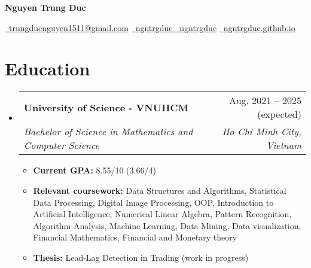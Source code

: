 \documentclass[letterpaper,11pt]{article}
\makeatletter
\newcommand{\heading}[4]{
    \normalsize
    \begin{tabular*}{0.97\textwidth}[t]{l@{\extracolsep{\fill}}r}
      \textbf{#1} & #2 \\[-2pt]
      \textit{\small#3} & \textit{\small #4}
    \end{tabular*}
    \vspace{-2pt}
}
\makeatother
\begin{document}
\begin{center}
    {\Huge \textbf{Nguyen Trung Duc}} \\
    \vspace{0.7em}

    \href{mailto:trungducnguyen1511@gmail.com}{\faEnvelope\ {trungducnguyen1511@gmail.com}} \quad 
    \href{https://www.linkedin.com/in/ngntrgduc/}{\faLinkedin\ {ngntrgduc}
    } \quad
    \href{https://github.com/ngntrgduc}{\faGithub\ {ngntrgduc}} \quad
    \href{https://ngntrgduc.github.io/}{\faHome\ {ngntrgduc.github.io}} 
\end{center}




\section{Education}
\begin{itemize}
    \item \heading{University of Science - VNUHCM}{Aug. 2021 -- 2025 (expected)}
      {Bachelor of Science in Mathematics and Computer Science}{Ho Chi Minh City, Vietnam}
    \begin{itemize}
        \item \textbf{Current GPA:} 8.55/10 (3.66/4)
        \item \textbf{Relevant coursework:}
        Data Structures and Algorithms, 
        Statistical Data Processing, 
        Digital Image Processing,
        OOP, %
        Introduction to Artificial Intelligence,
        Numerical Linear Algebra,
        Pattern Recognition,
        Algorithm Analysis,
        Machine Learning,
        Data Mining,
        Data visualization,
        Financial Mathematics, 
        Financial and Monetary theory
        \item \textbf{Thesis:} Lead-Lag Detection in Trading
        (work in progress)
    \end{itemize}
\end{itemize}
\end{document}
